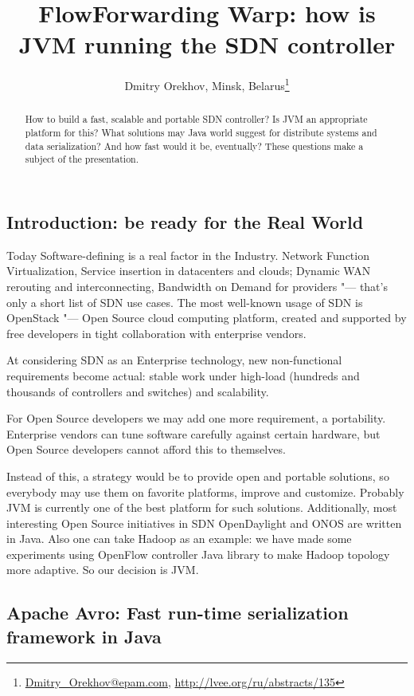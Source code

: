 \documentclass[10pt, a5paper]{article}
\begin{document}
\title{FlowForwarding Warp: how is JVM running the SDN controller}
\author{Dmitry Orekhov, Minsk, Belarus\footnote{\url{Dmitry_Orekhov@epam.com}, \url{http://lvee.org/ru/abstracts/135}}}
\maketitle
\begin{abstract}
How to build a fast, scalable and portable SDN controller? Is JVM an appropriate platform for this? What solutions may Java world suggest for distribute systems and data serialization? And how fast would it be, eventually?
These questions make a subject of the presentation.
\end{abstract}
\subsection*{Introduction: be ready for the Real World}

Today Software-defining is a real factor in the Industry. Network Function Virtualization, Service insertion in datacenters and clouds; Dynamic WAN rerouting and interconnecting, Bandwidth on Demand for providers "--- that's only a short list of SDN use cases. The most well-known usage of SDN is OpenStack "--- Open Source cloud computing platform, created and supported by free developers in tight collaboration with enterprise vendors.

At considering SDN as an Enterprise technology, new non-functional requirements become actual: stable work under high-load (hundreds and thousands of controllers and switches) and scalability.

For Open Source developers we may add one more requirement, a portability. Enterprise vendors can tune software carefully against certain hardware, but Open Source developers cannot afford this to themselves.

Instead of this, a strategy would be to provide open and portable solutions, so everybody may use them on favorite platforms, improve and customize. Probably JVM is currently one of the best platform for such solutions. 
Additionally, most interesting Open Source initiatives in SDN OpenDaylight and ONOS are written in Java. Also one can take Hadoop as an example: we have made some experiments using OpenFlow controller Java library to make Hadoop topology more adap\-tive. 
So our decision is JVM.

\subsection*{Apache Avro: Fast run-time serialization framework in Java}
\end{document}
